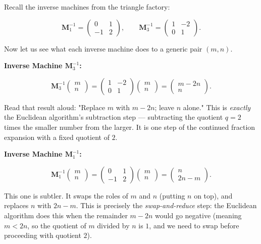 Recall the inverse machines from the triangle factory:

\[
\mathbf{M}_1^{-1} = \begin{pmatrix} 0 & 1 \\ -1 & 2 \end{pmatrix}, \qquad
\mathbf{M}_3^{-1} = \begin{pmatrix} 1 & -2 \\ 0 & 1 \end{pmatrix}.\]

Now let us see what each inverse machine does to a generic pair $(m, n)$.

\textbf{Inverse Machine $\mathbf{M}_3^{-1}$:}

\[
\mathbf{M}_3^{-1} \begin{pmatrix} m \\ n \end{pmatrix} = \begin{pmatrix} 1 & -2 \\ 0 & 1 \end{pmatrix} \begin{pmatrix} m \\ n \end{pmatrix} = \begin{pmatrix} m - 2n \\ n \end{pmatrix}.\]

Read that result aloud: "Replace $m$ with $m - 2n$; leave $n$ alone." This is \textit{exactly} the Euclidean algorithm's subtraction step --- subtracting the quotient $q = 2$ times the smaller number from the larger. It is one step of the continued fraction expansion with a fixed quotient of $2$.

\textbf{Inverse Machine $\mathbf{M}_1^{-1}$:}

\[
\mathbf{M}_1^{-1} \begin{pmatrix} m \\ n \end{pmatrix} = \begin{pmatrix} 0 & 1 \\ -1 & 2 \end{pmatrix} \begin{pmatrix} m \\ n \end{pmatrix} = \begin{pmatrix} n \\ 2n - m \end{pmatrix}.\]

This one is subtler. It swaps the roles of $m$ and $n$ (putting $n$ on top), and replaces $n$ with $2n - m$. This is precisely the \textit{swap-and-reduce} step: the Euclidean algorithm does this when the remainder $m - 2n$ would go negative (meaning $m < 2n$, so the quotient of $m$ divided by $n$ is $1$, and we need to swap before proceeding with quotient $2$).

